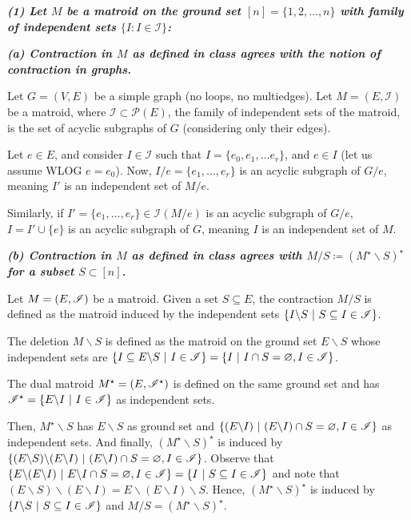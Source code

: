 \textbf{\textit{(1) Let $M$ be a matroid on the ground set $[n] = \lbrace 1, 2, \dots, n \rbrace$ with family of independent sets $\lbrace I : I \in \mathcal{I}\rbrace$:}}

\vspace{3pt}

\hspace{5pt} \textbf{\textit{(a) Contraction in $M$ as defined in class agrees with the notion of contraction in graphs.}}

\vspace{3pt}

Let $G = (V, E)$ be a simple graph (no loops, no multiedges). Let $M = (E, \mathcal I)$ be a matroid, where $\mathcal I \subset \mathcal P(E)$, the family of independent sets of the matroid, is the set of acyclic subgraphs of $G$ (considering only their edges).

Let $e \in E$, and consider $I \in \mathcal I$ such that $I = \{e_0, e_1, \ldots e_r\}$, and $e \in I$ (let us assume WLOG $e = e_0$). Now, $I/e = \{e_1, \ldots, e_r\}$ is an acyclic subgraph of $G/e$, meaning $I'$ is an independent set of $M/e$.

Similarly, if $I' = \{e_1, \ldots, e_r\} \in \mathcal I(M/e)$ is an acyclic subgraph of $G/e$, $I = I' \cup \{e\}$ is an acyclic subgraph of $G$, meaning $I$ is an independent set of $M$.


\hspace{5pt} \textbf{\textit{(b) Contraction in $M$ as defined in class agrees with $M / S \coloneqq (M^\star \backslash S)^\star$ for a subset $S \subset [n]$.}}

\vspace{3pt}

Let $M=(E,\mathscr{I})$ be a matroid. Given a set $S\subseteq E$, the contraction $M/S$ is defined as the matroid induced by the independent sets $\{I \backslash S \ | \ S\subseteq I \in \I\}$.

The deletion $M \backslash S$ is defined as the matroid on the ground set $E\backslash S$ whose independent sets are $\{I\subseteq E\backslash S \ | \ I\in\mathscr{I}\} = \{I \ | \ I\cap S = \varnothing, I\in\mathscr{I}\}$.

The dual matroid $M^\star=(E,\mathscr{I}^\star)$ is defined on the same ground set and has $\mathscr{I}^\star=\{E \backslash I \ | \ I\in\mathscr{I}\}$ as independent sets.

Then, $M^\star \backslash S$ has $E\backslash S$ as ground set and $\{(E\backslash I) \ | \ (E \backslash I)\cap S=\varnothing, I\in\mathscr{I}\}$ as independent sets. And finally, $(M^\star \backslash S)^\star$ is induced by $\{(E\backslash S)\backslash (E\backslash I) \ | \ (E \backslash I)\cap S=\varnothing, I\in\mathscr{I}\}$. Observe that $\{E\backslash(E\backslash I) \ | \ E\backslash I \cap S = \varnothing,I\in\mathscr{I}\}=\{I \ | \ S\subseteq I\in \mathscr{I}\}$ and note that $(E\backslash S)\backslash (E\backslash I) = E\backslash(E\backslash I)\backslash S$. Hence, $(M^\star \backslash S)^\star$ is induced by $\{I \backslash S \ | \ S\subseteq I \in \I\}$ and $M/S=(M^\star \backslash S)^\star$.

